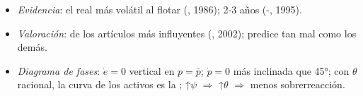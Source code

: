 \documentclass{article}
\begin{document}
\begin{columnas}
\begin{itemize}
\begin{itemize}
  \item producción variable; NOEM: sí con precios en la moneda del comprador (-, 2000).
  \end{itemize}
\item \emph{Evidencia}: el real más volátil al flotar (, 1986);  2-3 años (-, 1995).
\item \emph{Valoración}: de los artículos más influyentes (, 2002); predice tan mal como los demás. \item \emph{Diagrama de fases}: $\dot e=0$ vertical en $p=\bar p$; $\dot p=0$ más inclinada que 45°; con $\theta$ racional, la curva de los activos es la ; ↑$\psi$ $\Rightarrow$ ↑$\theta$ $\Rightarrow$ menos sobrerreacción.
\end{itemize}


\end{columnas}
\end{document}
